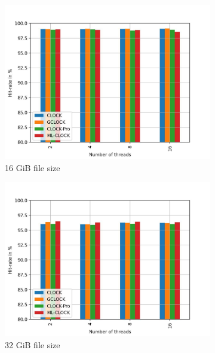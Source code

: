 \documentclass[
	12pt,
	a4paper,
	abstract,
	bibliography=totoc,
	chapterprefix,
	headings=openright,
	numbers=endperiod,
	parskip=half,
	twoside,
]{scrreprt}
\begin{document}
\begin{figure}[H]
	\centering
	\begin{subfigure}{0.4\textwidth}
		\includegraphics[width=\textwidth]{multi_16_gb_rw_90to10_zoned.jpg}		
		\caption{16 GiB file size}
		\label{fig:rw_90to10 16 zoned}
	\end{subfigure}
	\hfill
	\begin{subfigure}{0.4\textwidth}
		\includegraphics[width=\textwidth]{multi_32_gb_rw_90to10_zoned.jpg}		
		\caption{32 GiB file size}
		\label{fig:rw_90to10 32 zoned}
	\end{subfigure}
	\hfill
	\begin{subfigure}{0.4\textwidth}

\end{subfigure}
\end{figure}
\end{document}
